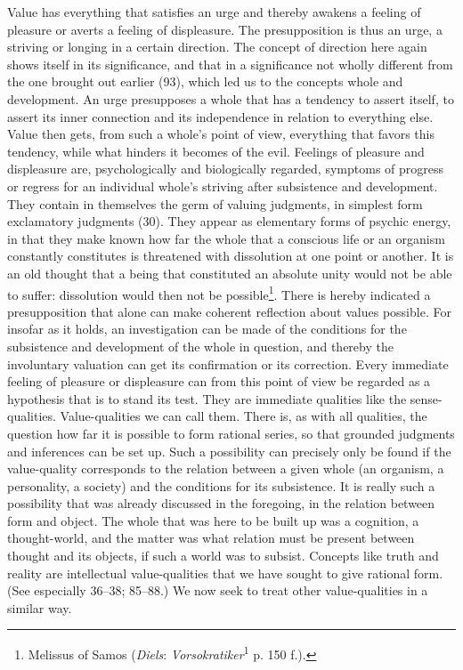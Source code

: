 \documentclass[12pt,a4paper]{book}
\newcommand{\opage}[1]{\marginnote{\footnotesize\textit{[#1]}}}
\begin{document}
Value has everything that satisfies an urge and thereby awakens a feeling of
pleasure or averts a feeling of displeasure. The presupposition is thus an
urge, a striving or longing in a certain direction. The concept of direction
here again shows itself in its significance, and that in a significance not
wholly different from the one brought out earlier (93), which led us to the
concepts whole and development. An urge presupposes a whole that has a
tendency to assert itself, to assert its inner connection and its
independence in relation to everything else. Value then gets, from such a
whole's point of view, everything that favors this tendency, while what
hinders it becomes of the evil. Feelings of pleasure and displeasure are,
psychologically and biologically regarded, symptoms of progress or regress
for an individual whole's striving after subsistence and development. They
contain in themselves the germ of valuing judgments, in simplest form
exclamatory judgments (30). They appear as elementary forms of psychic
energy, in that they make known how far the whole that a conscious life or an
organism constantly constitutes is threatened with dissolution at one point
or another. It is an old thought that a being that constituted an absolute
unity would not be able to suffer: dissolution would then not be
possible\footnote{Melissus of Samos (\emph{Diels}:
\emph{Vorsokratiker}\textsuperscript{1} p. 150 f.).}. There is hereby
indicated a presupposition that alone can make coherent reflection about
values possible. For insofar as it holds, an investigation can be made of the
conditions for the subsistence and development of the whole in question, and
thereby the involuntary valuation can get its confirmation or its correction.
\opage{239}Every immediate feeling of pleasure or displeasure can from this point of
view be regarded as a hypothesis that is to stand its test. They are
immediate qualities like the sense-qualities. Value-qualities we can call
them. There is, as with all qualities, the question how far it is possible to
form rational series, so that grounded judgments and inferences can be set
up. Such a possibility can precisely only be found if the value-quality
corresponds to the relation between a given whole (an organism, a
personality, a society) and the conditions for its subsistence. It is really
such a possibility that was already discussed in the foregoing, in the
relation between form and object. The whole that was here to be built up was a
cognition, a thought-world, and the matter was what relation must be present
between thought and its objects, if such a world was to subsist. Concepts
like truth and reality are intellectual value-qualities that we have sought to
give rational form. (See especially 36--38; 85--88.) We now seek to treat
other value-qualities in a similar way.
\end{document}
